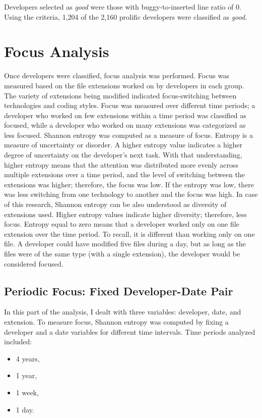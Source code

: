 Developers selected as \textit{good} were those with buggy-to-inserted line ratio of 0. Using the criteria, 1,204 of the 2,160 prolific developers were classified as \textit{good}.


\section{Focus Analysis}

Once developers were classified, focus analysis was performed. Focus was measured based on the file extensions worked on by developers in each group. The variety of extensions being modified indicated focus-switching between technologies and coding styles. Focus was measured over different time periods; a developer who worked on few extensions within a time period was classified as focused, while a developer who worked on many extensions was categorized as less focused. Shannon entropy was computed as a measure of focus. Entropy is a measure of uncertainty or disorder\parencite{slides}. A higher entropy value indicates a higher degree of uncertainty on the developer's next task. With that understanding, higher entropy means that the attention was distributed more evenly across multiple extensions over a time period, and the level of switching between the extensions was higher; therefore, the focus was low. If the entropy was low, there was less switching from one technology to another and the focus was high. In case of this research, Shannon entropy can be also understood as diversity of extensions used. Higher entropy values indicate higher diversity; therefore, less focus. Entropy equal to zero means that a developer worked only on one file extension over the time period. To recall, it is different than working only on one file. A developer could have modified five files during a day, but as long as the files were of the same type (with a single extension), the developer would be considered focused. \par

\subsection{Periodic Focus: Fixed Developer-Date Pair}

In this part of the analysis, I dealt with three variables: developer, date, and extension. To measure focus, Shannon entropy was computed by fixing a developer and a date variables for different time intervals. Time periods analyzed included:
\begin{itemize}
  \item 4 years,
  \item 1 year,
  \item 1 week,
  \item 1 day.
\end{itemize}

